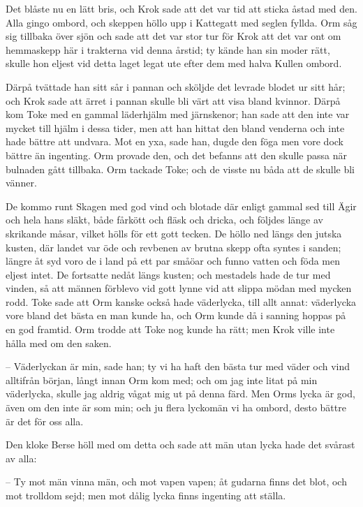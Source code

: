 \initial Det blåste nu en lätt bris, och Krok sade att det var tid att sticka åstad med den. Alla gingo ombord, och skeppen höllo upp i Kattegatt med seglen fyllda. Orm såg sig tillbaka över sjön och sade att det var stor tur för Krok att det var ont om hemmaskepp här i trakterna vid denna årstid; ty kände han sin moder rätt, skulle hon eljest vid detta laget legat ute efter dem med halva Kullen ombord.

\initial Därpå tvättade han sitt sår i pannan och sköljde det levrade blodet ur sitt hår; och Krok sade att ärret i pannan skulle bli värt att visa bland kvinnor. Därpå kom Toke med en gammal läderhjälm med järnskenor; han sade att den inte var mycket till hjälm i dessa tider, men att han hittat den bland venderna och inte hade bättre att undvara. Mot en yxa, sade han, dugde den föga men vore dock bättre än ingenting. Orm provade den, och det befanns att den skulle passa när bulnaden gått tillbaka. Orm tackade Toke; och de visste nu båda att de skulle bli vänner.

\initial De kommo runt Skagen med god vind och blotade där enligt gammal sed till Ägir och hela hans släkt, både fårkött och fläsk och dricka, och följdes länge av skrikande måsar, vilket hölls för ett gott tecken. De höllo ned längs den jutska kusten, där landet var öde och revbenen av brutna skepp ofta syntes i sanden; längre åt syd voro de i land på ett par småöar och funno vatten och föda men eljest intet. De fortsatte nedåt längs kusten; och mestadels hade de tur med vinden, så att männen förblevo vid gott lynne vid att slippa mödan med mycken rodd. Toke sade att Orm kanske också hade väderlycka, till allt annat: väderlycka vore bland det bästa en man kunde ha, och Orm kunde då i sanning hoppas på en god framtid. Orm trodde att Toke nog kunde ha rätt; men Krok ville inte hålla med om den saken.

– Väderlyckan är min, sade han; ty vi ha haft den bästa tur med väder och vind alltifrån början, långt innan Orm kom med; och om jag inte litat på min väderlycka, skulle jag aldrig vågat mig ut på denna färd. Men Orms lycka är god, även om den inte är som min; och ju flera lyckomän vi ha ombord, desto bättre är det för oss alla.

\initial Den kloke Berse höll med om detta och sade att män utan lycka hade det svårast av alla:

– Ty mot män vinna män, och mot vapen vapen; åt gudarna finns det blot, och mot trolldom sejd; men mot dålig lycka finns ingenting att ställa.

